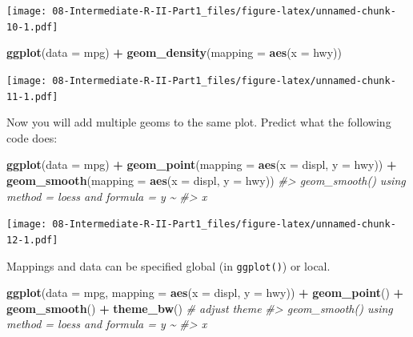 \documentclass[
]{book}
\newenvironment{Shaded}{\begin{snugshade}}{\end{snugshade}}
\newcommand{\AttributeTok}[1]{\textcolor[rgb]{0.13,0.29,0.53}{#1}}
\newcommand{\CommentTok}[1]{\textcolor[rgb]{0.56,0.35,0.01}{\textit{#1}}}
\newcommand{\FunctionTok}[1]{\textcolor[rgb]{0.13,0.29,0.53}{\textbf{#1}}}
\newcommand{\NormalTok}[1]{#1}
\newcommand{\SpecialCharTok}[1]{\textcolor[rgb]{0.81,0.36,0.00}{\textbf{#1}}}
\begin{document}
\texttt{[image: 08-Intermediate-R-II-Part1\_files/figure-latex/unnamed-chunk-10-1.pdf]}

\begin{Shaded}
\begin{Highlighting}[]
\FunctionTok{ggplot}\NormalTok{(}\AttributeTok{data =}\NormalTok{ mpg) }\SpecialCharTok{+}
  \FunctionTok{geom\_density}\NormalTok{(}\AttributeTok{mapping =} \FunctionTok{aes}\NormalTok{(}\AttributeTok{x =}\NormalTok{ hwy))}
\end{Highlighting}
\end{Shaded}

\texttt{[image: 08-Intermediate-R-II-Part1\_files/figure-latex/unnamed-chunk-11-1.pdf]}

Now you will add multiple geoms to the same plot.
Predict what the following code does:

\begin{Shaded}
\begin{Highlighting}[]
\FunctionTok{ggplot}\NormalTok{(}\AttributeTok{data =}\NormalTok{ mpg) }\SpecialCharTok{+}
  \FunctionTok{geom\_point}\NormalTok{(}\AttributeTok{mapping =} \FunctionTok{aes}\NormalTok{(}\AttributeTok{x =}\NormalTok{ displ, }\AttributeTok{y =}\NormalTok{ hwy)) }\SpecialCharTok{+}
  \FunctionTok{geom\_smooth}\NormalTok{(}\AttributeTok{mapping =} \FunctionTok{aes}\NormalTok{(}\AttributeTok{x =}\NormalTok{ displ, }\AttributeTok{y =}\NormalTok{ hwy))}
\CommentTok{\#\textgreater{} \textasciigrave{}geom\_smooth()\textasciigrave{} using method = \textquotesingle{}loess\textquotesingle{} and formula = \textquotesingle{}y \textasciitilde{}}
\CommentTok{\#\textgreater{} x\textquotesingle{}}
\end{Highlighting}
\end{Shaded}

\texttt{[image: 08-Intermediate-R-II-Part1\_files/figure-latex/unnamed-chunk-12-1.pdf]}

Mappings and data can be specified global (in \texttt{ggplot()}) or local.

\begin{Shaded}
\begin{Highlighting}[]
\FunctionTok{ggplot}\NormalTok{(}\AttributeTok{data =}\NormalTok{ mpg, }\AttributeTok{mapping =} \FunctionTok{aes}\NormalTok{(}\AttributeTok{x =}\NormalTok{ displ, }\AttributeTok{y =}\NormalTok{ hwy)) }\SpecialCharTok{+}
  \FunctionTok{geom\_point}\NormalTok{() }\SpecialCharTok{+}
  \FunctionTok{geom\_smooth}\NormalTok{() }\SpecialCharTok{+} \FunctionTok{theme\_bw}\NormalTok{()       }\CommentTok{\# adjust theme}
\CommentTok{\#\textgreater{} \textasciigrave{}geom\_smooth()\textasciigrave{} using method = \textquotesingle{}loess\textquotesingle{} and formula = \textquotesingle{}y \textasciitilde{}}
\CommentTok{\#\textgreater{} x\textquotesingle{}}
\end{Highlighting}
\end{Shaded}
\end{document}
